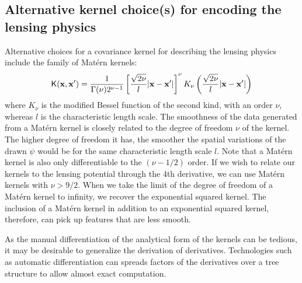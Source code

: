 \subsection{Alternative kernel choice(s) for encoding the lensing physics}
Alternative choices for a covariance kernel for describing the lensing physics 
include the family of Mat\'{e}rn kernels:
\begin{equation}
	\mathsf{K}(\mathbf{x}, \mathbf{x}') = \frac{1}{\Gamma(\nu)2^{\nu-1}}\left[
		\frac{\sqrt{2\nu}}{l}|\mathbf{x} - \mathbf{x}'|
	\right]^\nu K_\nu \left(\frac{\sqrt{2\nu}}{l}|\mathbf{x}-\mathbf{x}'|\right) 
\end{equation}
where $K_\nu$ is the modified Bessel function of the second kind, with an order
$\nu$, whereas $l$ is the characteristic length scale.
The smoothness of the data generated from a Mat\'{e}rn kernel is closely
related to the degree of freedom $\nu$ of the kernel. 
The higher degree of freedom it has, the smoother the spatial variations of the
drawn $\psi$ would be for the same characteristic length scale $l$.
Note that a Mat\'{e}rn kernel is also only differentiable to the $(\nu-1/2)$ order.
If we wish to relate our kernels to the lensing potential through the 4th
derivative, we can use Mat\'{e}rn kernels with $\nu > 9/2$. 
When we take the limit of the degree of freedom of a Mat\'{e}rn kernel to infinity, 
we recover the exponential squared kernel. The inclusion of a Mat\'{e}rn kernel
in addition to an exponential squared kernel, therefore, can pick up features
that are less smooth.

As the manual differentiation of the analytical form of the kernels can be tedious,
it may be desirable to generalize the derivation of derivatives. Technologies such
as automatic differentiation can spreads factors of the derivatives over a tree
structure to allow almost exact computation. 
 




% 
% 

